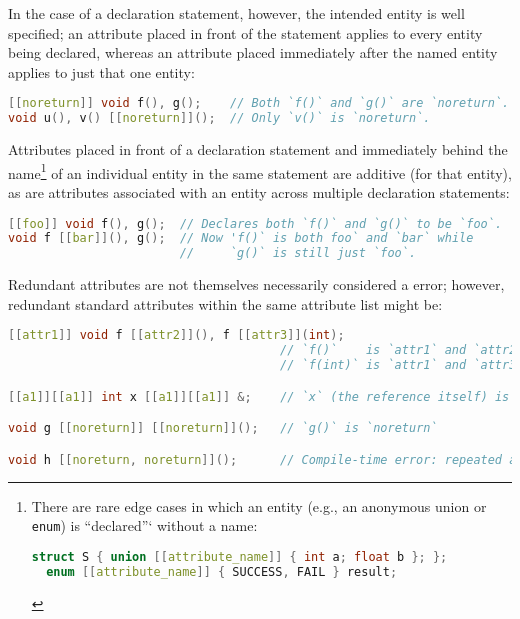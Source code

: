 \documentclass[twoside,10pt,letterpaper,usenames]{newstyle-PearsonGeneric-7-38}
\begin{document}
In the case of a declaration statement, however, the intended entity is
well specified; an attribute placed in front of the statement applies to
every entity being declared, whereas an attribute placed immediately
after the named entity applies to just that one entity:

\begin{lstlisting}[language=C++, caption={missing caption}, label={testlabel}, frame=tb]
[[noreturn]] void f(), g();    // Both `f()` and `g()` are `noreturn`.
void u(), v() [[noreturn]]();  // Only `v()` is `noreturn`.
\end{lstlisting}
    

Attributes placed in front of a declaration statement and immediately
behind the name{\cprotect\footnote{There are rare edge cases in which an
  entity (e.g., an anonymous union or \texttt{enum}) is ``declared''`
  without a name:

  \begin{lstlisting}[language=C++, label={testlabel}, basicstyle={\ttfamily\footnotesize}]
  struct S { union [[attribute_name]] { int a; float b }; };
  enum [[attribute_name]] { SUCCESS, FAIL } result;
  \end{lstlisting}
      }} of an individual entity in the same statement are additive (for
that entity), as are attributes associated with an entity across
multiple declaration statements:

\begin{lstlisting}[language=C++, caption={missing caption}, label={testlabel}, frame=tb]
[[foo]] void f(), g();  // Declares both `f()` and `g()` to be `foo`.
void f [[bar]](), g();  // Now 'f()` is both foo` and `bar` while
                        //     `g()` is still just `foo`.
\end{lstlisting}
    

Redundant attributes are not themselves necessarily considered a error;
however, redundant standard attributes within the same attribute list
might be:

\begin{lstlisting}[language=C++, caption={missing caption}, label={testlabel}, frame=tb]
[[attr1]] void f [[attr2]](), f [[attr3]](int);
                                      // `f()`    is `attr1` and `attr2`
                                      // `f(int)` is `attr1` and `attr3`

[[a1]][[a1]] int x [[a1]][[a1]] &;    // `x` (the reference itself) is `a1`

void g [[noreturn]] [[noreturn]]();   // `g()` is `noreturn`

void h [[noreturn, noreturn]]();      // Compile-time error: repeated attribute
\end{lstlisting}
    
\end{document}
